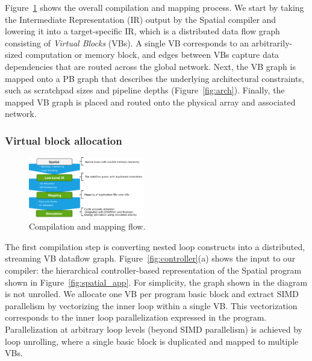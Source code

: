 Figure~\ref{fig:flow} shows the overall compilation and mapping process. 
We start by taking the Intermediate Representation (IR) output by the Spatial compiler and lowering it into a target-specific IR, which is a distributed data flow graph consisting of \emph{Virtual Blocks} (VBs).
A single VB corresponds to an arbitrarily-sized computation or memory block, and edges between VBs capture data dependencies that are routed across the global network.  
Next, the VB graph is mapped onto a PB graph that describes the underlying architectural constraints, such as scratchpad sizes and pipeline depths (Figure~\ref{fig:arch}).
Finally, the mapped VB graph is placed and routed onto the physical array and associated network.

\subsubsection{Virtual block allocation} \label{sec:allocation}

\begin{figure}
\centering
\includegraphics[width=0.45\textwidth]{figs/flow2.pdf}
\caption{Compilation and mapping flow.}\label{fig:flow}
\end{figure}

The first compilation step is converting nested loop constructs into a distributed, streaming VB dataflow graph.
Figure~\ref{fig:controller}(a) shows the input to our compiler: the hierarchical controller-based representation of the Spatial program shown in Figure~\ref{fig:spatial_app}.
For simplicity, the graph shown in the diagram is not unrolled.
We allocate one VB per program basic block and extract SIMD parallelism by vectorizing the inner loop within a single VB.
This vectorization corresponds to the inner loop parallelization expressed in the program. 
Parallelization at arbitrary loop levels (beyond SIMD parallelism) is achieved by loop unrolling, where a single basic block is duplicated and mapped to multiple VBs.

